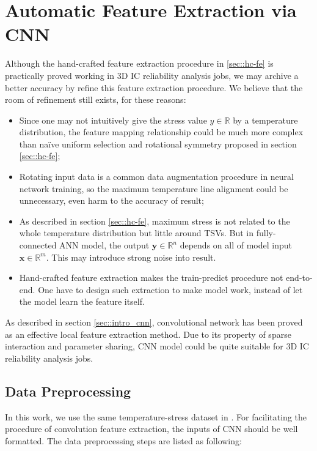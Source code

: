 \section{Automatic Feature Extraction via CNN}
Although the hand-crafted feature extraction procedure in \ref{sec::hc-fe} is 
practically proved working in 3D IC reliability analysis jobs,
we may archive a better accuracy by refine this feature extraction procedure.
We believe that the room of refinement still exists, for these reasons:
\begin{itemize}
    \item Since one may not intuitively give the stress value $y\in\mathbb{R}$
    by a temperature distribution, the feature mapping relationship could be
    much more complex than na\"ive uniform selection and rotational symmetry proposed
    in section \ref{sec::hc-fe};
    
    \item Rotating input data is a common data augmentation procedure in neural
    network training\cite{Goodfellow2016Deep}, 
    so the maximum temperature line alignment could be unnecessary,
    even harm to the accuracy of result;
    
    \item As described in section \ref{sec::hc-fe}, maximum stress is not related to
    the whole temperature distribution but little around TSVs. But in fully-connected
    ANN model, the output $\mathbf{y}\in\mathbb{R}^n$ depends on all of model input 
    $\mathbf{x}\in\mathbb{R}^m$. This may introduce strong noise into result.
    
    \item Hand-crafted feature extraction makes the train-predict procedure not
    end-to-end. One have to design such extraction to make model work, instead of
    let the model learn the feature itself.
\end{itemize}

As described in section \ref{sec::intro_cnn}, convolutional network has been proved as
an effective local feature extraction method. Due to its property of sparse interaction
and parameter sharing, CNN model could be quite suitable for 3D IC reliability analysis jobs.

\subsection{Data Preprocessing}
In this work, we use the same temperature-stress dataset in \cite{Zhang2016Fast}. 
For facilitating the procedure of convolution feature extraction, 
the inputs of CNN should be well formatted. 
The data preprocessing steps are listed as following:

